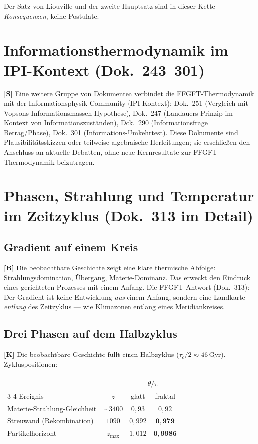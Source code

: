 Der Satz von Liouville und der zweite Hauptsatz sind in dieser
Kette \emph{Konsequenzen}, keine Postulate.

\section{Informationsthermodynamik im IPI-Kontext (Dok.~243--301)}

\textbf{[S]} Eine weitere Gruppe von Dokumenten verbindet die
FFGFT-Thermodynamik mit der Informationsphysik-Community (IPI-Kontext):
Dok.~251 (Vergleich mit Vopsons Informationsmassen-Hypothese),
Dok.~247 (Landauers Prinzip im Kontext von Informationszuständen),
Dok.~290 (Informationsfrage Betrag/Phase),
Dok.~301 (Informations-Umkehrtest).
Diese Dokumente sind Plausibilitätsskizzen oder teilweise algebraische
Herleitungen; sie erschließen den Anschluss an aktuelle Debatten,
ohne neue Kernresultate zur FFGFT-Thermodynamik beizutragen.

\section{Phasen, Strahlung und Temperatur im Zeitzyklus (Dok.~313 im Detail)}

\subsection{Gradient auf einem Kreis}

\textbf{[B]} Die beobachtbare Geschichte zeigt eine klare thermische
Abfolge: Strahlungsdomination, Übergang, Materie-Dominanz. Das
erweckt den Eindruck eines gerichteten Prozesses mit einem Anfang.
Die FFGFT-Antwort (Dok.~313): Der Gradient ist keine Entwicklung
\emph{aus} einem Anfang, sondern eine Landkarte \emph{entlang} des
Zeitzyklus --- wie Klimazonen entlang eines Meridiankreises.

\subsection{Drei Phasen auf dem Halbzyklus}

\textbf{[K]} Die beobachtbare Geschichte füllt einen Halbzyklus
($\tau_c/2 \approx 46$\,Gyr). Zykluspositionen:

\begin{center}
\small
\begin{tabular}{lccc}
\toprule
& & \multicolumn{2}{c}{$\theta/\pi$} \\
\cmidrule(l){3-4}
Ereignis & $z$ & glatt & fraktal \\
\midrule
Materie-Strahlung-Gleichheit & $\sim\!3400$ & $0{,}93$ & $0{,}92$ \\
Streuwand (Rekombination) & $1090$ & $0{,}992$ & $\mathbf{0{,}979}$ \\
Partikelhorizont & $z_\text{max}$ & $1{,}012$ & $\mathbf{0{,}9986}$ \\
\bottomrule
\end{tabular}
\end{center}

